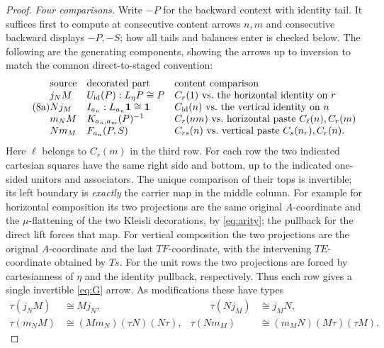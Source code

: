\documentclass[11pt]{article}
\theoremstyle{definition}\newtheorem{definition}[theorem]{Definition}
\newcommand{\id}{\mathrm{id}}\newcommand{\op}{\mathrm{op}}\newcommand{\dom}{\mathrm{dom}}
\begin{document}
\begin{proof}
\emph{Four comparisons.} Write $-P$ for the backward context with
identity tail. It suffices first to compute at consecutive content
arrows $n,m$ and consecutive backward displays $-P,-S$; how all
tails and balances enter is checked below. The following are the
generating components, showing the arrows up to inversion to match
the common direct-to-staged convention:
\begin{equation}\tag{8a}\label{eq:four}
\begin{array}{@{}lll@{}}
\text{source}& \text{decorated part}&\text{content comparison}\\
j_N M &U_{\id}(P):L_{\eta}P\cong P&
 C_r(1)\ \text{vs.\ the horizontal identity on }r\\
N j_M&I_{a_n}:L_{a_n}\un\cong\un&
 C_{\id}(n)\ \text{vs.\ the vertical identity on }n\\
m_N M&K_{a_n,a_m}(P)^{-1}&
 C_r(nm)\ \text{vs.\ horizontal paste }C_\ell(n),C_r(m)\\
N m_M&F_{a_n}(P,S)&
 C_{rs}(n)\ \text{vs.\ vertical paste }C_s(n_r),C_r(n).
\end{array}
\end{equation}
Here $\ell$ belongs to $C_r(m)$ in the third row.
For each row the two indicated cartesian squares have the same
right side and bottom, up to the indicated one-sided unitors and
associators. The unique comparison of their tops is invertible;
its left boundary is \emph{exactly} the carrier map in the middle
column. For example for horizontal composition its two projections
are the same original $A$-coordinate and the $\mu$-flattening
of the two Kleisli decorations, by \eqref{eq:arity}; the pullback for
the direct lift forces that map. For vertical composition the two
projections are the original $A$-coordinate and the last
$TF$-coordinate, with the intervening $TE$-coordinate obtained by
$Ts$. For the unit rows the two projections are forced by
cartesianness of $\eta$ and the identity pullback, respectively.
Thus each row gives a single invertible \eqref{eq:G} arrow.
As modifications these have types
\[
\begin{aligned}
 \tau(j_N M)&\cong Mj_N,&\qquad \tau(Nj_M)&\cong j_MN,\\
 \tau(m_N M)&\cong(Mm_N)(\tau N)(N\tau),&
 \tau(Nm_M)&\cong(m_M N)(M\tau)(\tau M).
\end{aligned}
\]


\end{proof}
\end{document}
